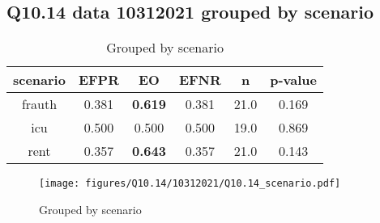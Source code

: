 \subsection{Q10.14 data 10312021 grouped by scenario}

\begin{comment}
            EFPR        EO      EFNR     n    pvalue
frauth  0.380952  0.619048  0.380952  21.0  0.169213
icu     0.500000  0.500000  0.500000  19.0  0.868534
rent    0.357143  0.642857  0.357143  21.0  0.143411
\end{comment}

\begin{table}[h]
    \centering
    \begin{tabular}{|c|c|c|c|c|c|}
        \hline
        scenario & EFPR & EO & EFNR & n & p-value\\
        \hline
        frauth & 0.381 & \textbf{0.619} & 0.381 & 21.0 & 0.169\\
		icu & 0.500 & 0.500 & 0.500 & 19.0 & 0.869\\
		rent & 0.357 & \textbf{0.643} & 0.357 & 21.0 & 0.143\\
		
        \hline
    \end{tabular}
    \caption{Grouped by scenario}
    \label{tab:my_label}
\end{table}
\begin{figure}[h]
    \centering
    \texttt{[image: figures/Q10.14/10312021/Q10.14\_scenario.pdf]}
    \caption{Grouped by scenario}
    \label{fig:my_label}
\end{figure}
